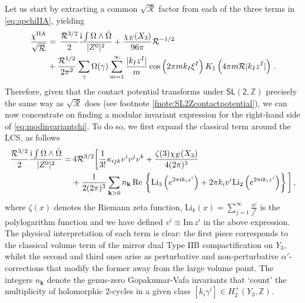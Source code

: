 Let us start by extracting a common $\sqrt{\mathcal{R}}$ factor from each of the three terms in \eqref{eq:apchiIIA}, yielding
%
\begin{align}\label{eq:modinvariantchi}
	\frac{\chi^{\rm IIA}}{\sqrt{\mathcal{R}}} &=\, \frac{\mathcal{R}^{3/2}}{2} \frac{{\rm i} \int\Omega \wedge \bar \Omega }{|Z^0|^2} + \frac{\chi_{E}(X_3)}{96\pi} \mathcal{R}^{-1/2} \notag\\
	&+ \frac{\mathcal{R}^{1/2}}{2\pi^2} \sum_{\gamma} \Omega (\gamma) \sum_{m=1}^{\infty} \frac{|k_I z^I|}{m} \cos \left( 2\pi m k_I \xi^I\right) K_1 \left( 4\pi m \mathcal{R}|k_I z^I|\right) \, .
\end{align}
%
Therefore, given that the contact potential transforms under $\mathsf{SL(2, \mathbb{Z})}$ precisely the same way as $\sqrt{\mathcal{R}}$ does (see footnote \ref{fnote:SL2Zcontactpotential}), we can now concentrate on finding a modular invariant expression for the right-hand side of \eqref{eq:modinvariantchi}. To do so, we first expand the classical term around the LCS, as follows
%
\begin{equation}\label{eq:chiclassical}
	\begin{aligned}
		\frac{\mathcal{R}^{3/2}}{2} \frac{{\rm i} \int\Omega \wedge \bar \Omega }{|Z^0|^2} =&\,  4 \mathcal{R}^{3/2} \bigg[ \frac{1}{3!} \kappa_{ijk} v^i v^j v^k + \frac{\zeta(3) \chi_{E}(X_3)}{4(2 \pi)^3}\\
		&+ \frac{1}{2(2 \pi)^3} \sum_{\textbf{k}>0} n_{\textbf{k}}\, \text{Re}\, \left \lbrace \text{Li}_3 \left( e^{2\pi \text{i}k_i z^i} \right) + 2\pi k_i v^i \text{Li}_2 \left( e^{2\pi \text{i}k_i z^i} \right)\right \rbrace \bigg ]\, ,
	\end{aligned}
\end{equation}
%
where $\zeta(x)$ denotes the Riemann zeta function, $\text{Li}_k (x)= \sum_{j=1}^{\infty} \frac{x^j}{j^k}$ is the polylogarithm function and we have defined $v^i \equiv \text{Im}\, z^i$ in the above expression. The physical interpretation of each term is clear: the first piece corresponds to the classical volume term of the mirror dual Type IIB compactification on $Y_3$, whilst the second and third ones arise as perturbative and non-perturbative $\alpha'$-corrections that modify the former away from the large volume point. The integers $n_{\textbf{k}}$ denote the genus-zero Gopakumar-Vafa invariants that `count' the multiplicity of holomorphic 2-cycles in a given class $[k_i \gamma^i] \in H^+_2(Y_3, \mathbb{Z})$.
	
